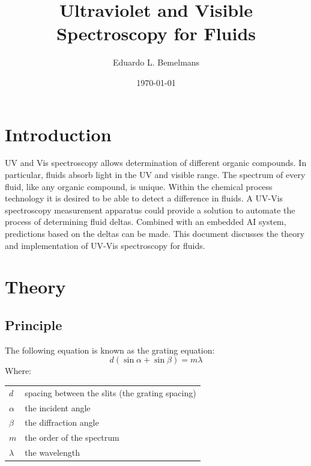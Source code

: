 \documentclass[aps,twocolumn,twoside,secnumarabic,balancelastpage,amsmath,amssymb,nofootinbib,hyperref=pdftex]{revtex4}
\makeatletter
\newenvironment{EqParameters}[1][]
  {#1 \begin{tabular}[t]{>{$}l<{$} @{${}={}$} l}}
  {\end{tabular}\\[\belowdisplayskip]}
\makeatother
\begin{document}
\title{Ultraviolet and Visible Spectroscopy for Fluids}
\author         {Eduardo L. Bemelmans}
\date{\today}

\begin{abstract}



\end{abstract}

\maketitle


\section{Introduction}
UV and Vis spectroscopy allows determination of different organic compounds. In particular, fluids absorb light in the UV and visible range. The spectrum of every fluid, like any organic compound, is unique. Within the chemical process technology it is desired to be able to detect a difference in fluids. A UV-Vis spectroscopy measurement apparatus could provide a solution to automate the process of determining fluid deltas. Combined with an embedded AI system, predictions based on the deltas can be made. This document discusses the theory and implementation of UV-Vis spectroscopy for fluids.

\section{Theory}
\subsection{Principle}

The following equation is known as the grating equation\cite{geqs}: %
\begin{equation}
   d(\sin{\alpha}+\sin{\beta})=m\lambda 
   \label{eq:gratingEquation1}
\end{equation}
Where:
\begin{EqParameters}
d    &  spacing between the slits (the grating spacing) \\
\alpha &  the incident angle \\
\beta &  the diffraction angle \\
m    &  the order of the spectrum \\
\lambda & the wavelength \\
\end{EqParameters}
\end{document}
